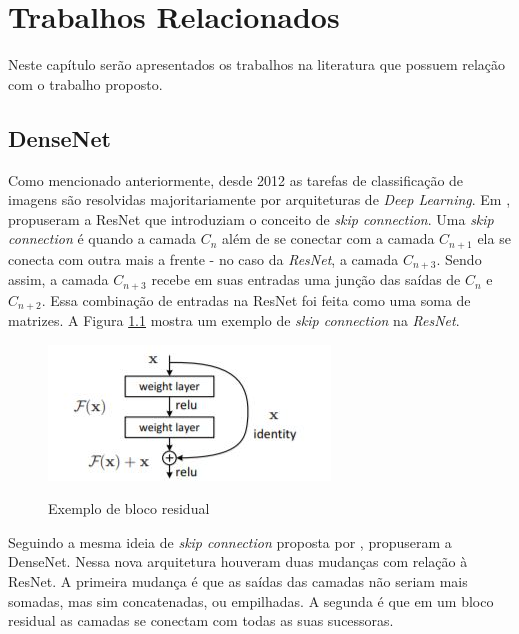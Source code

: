 \chapter{Trabalhos Relacionados}
\label{cap:3}
\vspace{-1.9cm}

Neste capítulo serão apresentados os trabalhos na literatura que possuem relação com o trabalho proposto.

\section{DenseNet}
\label{secao:3:1}

Como mencionado anteriormente, desde 2012 as tarefas de classificação de imagens são resolvidas majoritariamente por arquiteturas de \textit{Deep Learning}. Em \citeyear{he-2016}, \citeauthor{he-2016} propuseram a \ac{ResNet} que introduziam o conceito de \textit{skip connection}. Uma \textit{skip connection} é quando a camada $C_n$ além de se conectar com a camada $C_{n+1}$ ela se conecta com outra mais a frente - no caso da \textit{\ac{ResNet}}, a camada $C_{n+3}$. Sendo assim, a camada $C_{n+3}$ recebe em suas entradas uma junção das saídas de $C_{n}$ e $C_{n+2}$. Essa combinação de entradas na \ac{ResNet} foi feita como uma soma de matrizes. A Figura \ref{fig:blocoresidual} mostra um exemplo de \textit{skip connection} na \textit{\ac{ResNet}}.

\begin{figure}[H]
	\setlength{\abovecaptionskip}{0pt}
	\setlength{\belowcaptionskip}{0pt}
	\caption[Exemplo de bloco residual]{Exemplo de bloco residual}
	\centering
	\includegraphics[width=.5\textwidth]{imagem/0x_resnet_arch.jpg}
	\captionsetup{justification=centering}
	\label{fig:blocoresidual}
\end{figure}

Seguindo a mesma ideia de \textit{skip connection} proposta por ,  propuseram a \ac{DenseNet}. Nessa nova arquitetura houveram duas mudanças com relação à \ac{ResNet}. A primeira mudança é que as saídas das camadas não seriam mais somadas, mas sim concatenadas, ou empilhadas. A segunda é que em um bloco residual as camadas se conectam com todas as suas sucessoras. 

